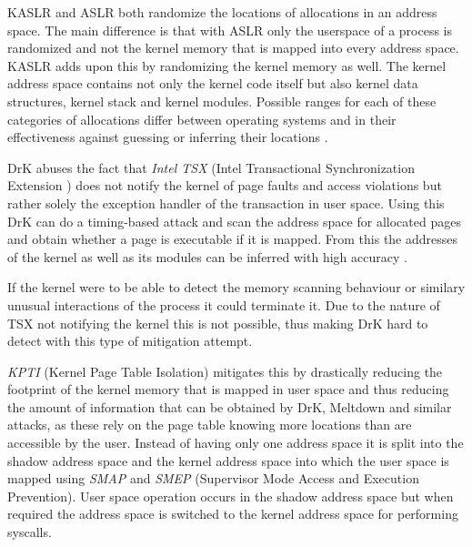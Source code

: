KASLR and ASLR both randomize the locations of allocations in an address space.
The main difference is that with ASLR only the userspace of a process is randomized and not the kernel memory that is mapped into every address space.
KASLR adds upon this by randomizing the kernel memory as well.
The kernel address space contains not only the kernel code itself but also kernel data structures, kernel stack and kernel modules.
Possible ranges for each of these categories of allocations differ between operating systems and in their effectiveness against guessing or inferring their locations \cite{drk}.

DrK abuses the fact that \textit{Intel TSX} (Intel Transactional Synchronization Extension \cite{intel-tsx-overview}) does not notify the kernel of page faults and access violations but rather solely the exception handler of the transaction in user space.
Using this DrK can do a timing-based attack and scan the address space for allocated pages and obtain whether a page is executable if it is mapped.
From this the addresses of the kernel as well as its modules can be inferred with high accuracy \cite{drk}.

If the kernel were to be able to detect the memory scanning behaviour or similary unusual interactions of the process it could terminate it.
Due to the nature of TSX not notifying the kernel this is not possible, thus making DrK hard to detect with this type of mitigation attempt.

\textit{KPTI} (Kernel Page Table Isolation) mitigates this by drastically reducing the footprint of the kernel memory that is mapped in user space and thus reducing the amount of information that can be obtained by DrK, Meltdown and similar attacks, as these rely on the page table knowing more locations than are accessible by the user.
Instead of having only one address space it is split into the shadow address space and the kernel address space into which the user space is mapped using \textit{SMAP} and \textit{SMEP} (Supervisor Mode Access and Execution Prevention).
User space operation occurs in the shadow address space but when required the address space is switched to the kernel address space for performing syscalls.\cite{kaiser}
